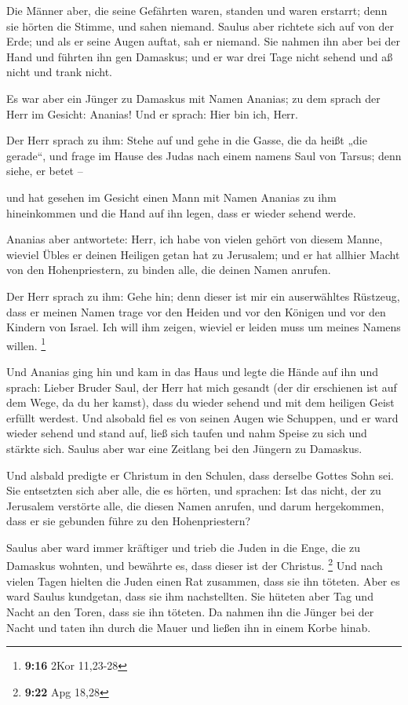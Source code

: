  Die Männer aber, die seine Gefährten waren, standen und
waren erstarrt; denn sie hörten die Stimme, und sahen niemand.
 Saulus aber richtete sich auf von der Erde; und als er
seine Augen auftat, sah er niemand. Sie nahmen ihn aber bei der Hand und
führten ihn gen Damaskus;  und er war drei Tage nicht sehend
und aß nicht und trank nicht.

 Es war aber ein Jünger zu Damaskus mit Namen Ananias; zu
dem sprach der Herr im Gesicht: Ananias! Und er sprach: Hier bin ich,
Herr.

 Der Herr sprach zu ihm: Stehe auf und gehe in die Gasse,
die da heißt „die gerade``, und frage im Hause des Judas nach einem
namens Saul von Tarsus; denn siehe, er betet --

 und hat gesehen im Gesicht einen Mann mit Namen Ananias zu
ihm hineinkommen und die Hand auf ihn legen, dass er wieder sehend
werde.

 Ananias aber antwortete: Herr, ich habe von vielen gehört
von diesem Manne, wieviel Übles er deinen Heiligen getan hat zu
Jerusalem;  und er hat allhier Macht von den
Hohenpriestern, zu binden alle, die deinen Namen anrufen.

 Der Herr sprach zu ihm: Gehe hin; denn dieser ist mir ein
auserwähltes Rüstzeug, dass er meinen Namen trage vor den Heiden und vor
den Königen und vor den Kindern von Israel.  Ich will ihm
zeigen, wieviel er leiden muss um meines Namens willen. \footnote{\textbf{9:16}
  2Kor 11,23-28}

 Und Ananias ging hin und kam in das Haus und legte die
Hände auf ihn und sprach: Lieber Bruder Saul, der Herr hat mich gesandt
(der dir erschienen ist auf dem Wege, da du her kamst), dass du wieder
sehend und mit dem heiligen Geist erfüllt werdest.  Und
alsobald fiel es von seinen Augen wie Schuppen, und er ward wieder
sehend  und stand auf, ließ sich taufen und nahm Speise zu
sich und stärkte sich. Saulus aber war eine Zeitlang bei den Jüngern zu
Damaskus.

 Und alsbald predigte er Christum in den Schulen, dass
derselbe Gottes Sohn sei.  Sie entsetzten sich aber alle,
die es hörten, und sprachen: Ist das nicht, der zu Jerusalem verstörte
alle, die diesen Namen anrufen, und darum hergekommen, dass er sie
gebunden führe zu den Hohenpriestern?

 Saulus aber ward immer kräftiger und trieb die Juden in
die Enge, die zu Damaskus wohnten, und bewährte es, dass dieser ist der
Christus. \footnote{\textbf{9:22} Apg 18,28}  Und nach
vielen Tagen hielten die Juden einen Rat zusammen, dass sie ihn töteten.
 Aber es ward Saulus kundgetan, dass sie ihm nachstellten.
Sie hüteten aber Tag und Nacht an den Toren, dass sie ihn töteten.
 Da nahmen ihn die Jünger bei der Nacht und taten ihn durch
die Mauer und ließen ihn in einem Korbe hinab.

